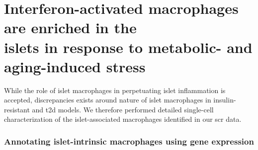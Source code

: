 \clearpage

\section[\glslink{ifn}{IFN}-activated macrophages are enriched in the islets in response to metabolic- and aging-induced stress]{Interferon-activated macrophages are enriched in the\\islets in response to metabolic- and aging-induced stress}
\label{sec:sc_macs}


While the role of islet macrophages in perpetuating islet inflammation is accepted, discrepancies exists around nature of islet macrophages in insulin-resistant and \gls{t2d} models. We therefore performed detailed single-cell characterization of the islet-associated macrophages identified in our \gls{scr} data. 

\subsubsection{\large Annotating islet-intrinsic macrophages using gene expression}
 
